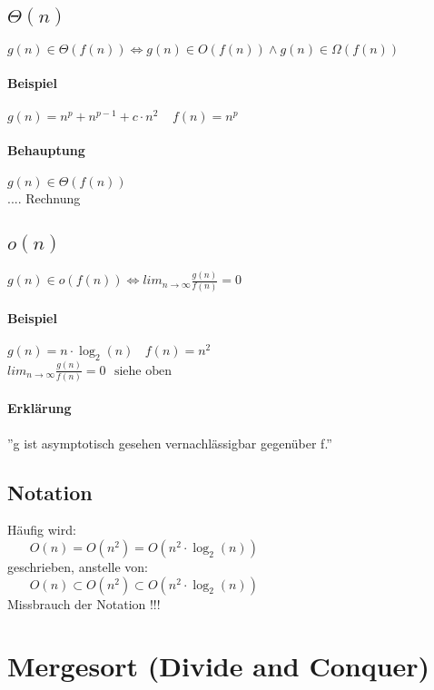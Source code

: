\subsection{$\Theta(n)$}
$g(n) \in \Theta(f(n)) \Leftrightarrow g(n) \in O(f(n)) \land g(n) \in \Omega(f(n))$
\paragraph{Beispiel} $g(n) = n^p + n^{p-1} + c \cdot n^2~~~~~f(n) = n^p$
\paragraph{Behauptung} $g(n) \in \Theta(f(n))$ \\
.... Rechnung

\subsection{$o(n)$}

$g(n) \in o(f(n)) \Leftrightarrow lim_{n \rightarrow \infty} \frac{g(n)}{f(n)} = 0$
\paragraph{Beispiel} $g(n) = n \cdot \log_2(n)~~~~f(n) = n^2$\\
$lim_{n \rightarrow \infty} \frac{g(n)}{f(n)} = 0~~~\text{siehe oben}$\\
\paragraph{Erklärung} ''g ist asymptotisch gesehen vernachlässigbar gegenüber f.''

\pagebreak


\begin{mdframed}
\subsection{Notation}
Häufig wird:\\
$~~~~~~~~O(n) = O(n^2) = O(n^2 \cdot \log_2(n))$ \\
geschrieben, anstelle von:\\
$~~~~~~~~O(n) \subset O(n^2) \subset O(n^2 \cdot \log_2(n))$ \\
Missbrauch der Notation !!!\\

\end{mdframed}


\section{Mergesort (Divide and Conquer)}

